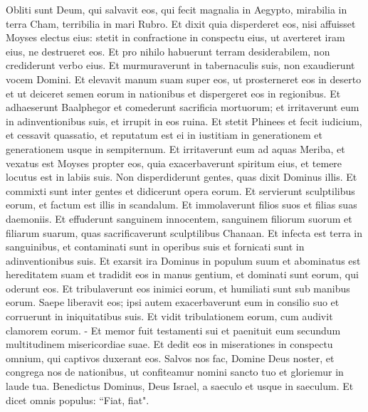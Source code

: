 \begin{biblechapter}
\verse Obliti sunt Deum, qui salvavit eos, qui fecit magnalia in Aegypto, 
\verse mirabilia in terra Cham, terribilia in mari Rubro. 
\verse Et dixit quia disperderet eos, nisi affuisset Moyses electus eius: stetit in confractione in conspectu eius, ut averteret iram eius, ne destrueret eos. 
\verse Et pro nihilo habuerunt terram desiderabilem, non crediderunt verbo eius. 
\verse Et murmuraverunt in tabernaculis suis, non exaudierunt vocem Domini. 
\verse Et elevavit manum suam super eos, ut prosterneret eos in deserto 
\verse et ut deiceret semen eorum in nationibus et dispergeret eos in regionibus. 
\verse Et adhaeserunt Baalphegor et comederunt sacrificia mortuorum; 
\verse et irritaverunt eum in adinventionibus suis, et irrupit in eos ruina. 
\verse Et stetit Phinees et fecit iudicium, et cessavit quassatio, 
\verse et reputatum est ei in iustitiam in generationem et generationem usque in sempiternum. 
\verse Et irritaverunt eum ad aquas Meriba, et vexatus est Moyses propter eos, 
\verse quia exacerbaverunt spiritum eius, et temere locutus est in labiis suis. 
\verse Non disperdiderunt gentes, quas dixit Dominus illis. 
\verse Et commixti sunt inter gentes et didicerunt opera eorum. 
\verse Et servierunt sculptilibus eorum, et factum est illis in scandalum. 
\verse Et immolaverunt filios suos et filias suas daemoniis. 
\verse Et effuderunt sanguinem innocentem, sanguinem filiorum suorum et filiarum suarum, quas sacrificaverunt sculptilibus Chanaan. Et infecta est terra in sanguinibus, 
\verse et contaminati sunt in operibus suis et fornicati sunt in adinventionibus suis. 
\verse Et exarsit ira Dominus in populum suum et abominatus est hereditatem suam 
\verse et tradidit eos in manus gentium, et dominati sunt eorum, qui oderunt eos. 
\verse Et tribulaverunt eos inimici eorum, et humiliati sunt sub manibus eorum. 
\verse Saepe liberavit eos; ipsi autem exacerbaverunt eum in consilio suo et corruerunt in iniquitatibus suis. 
\verse Et vidit tribulationem eorum, cum audivit clamorem eorum. - 
\verse Et memor fuit testamenti sui et paenituit eum secundum multitudinem misericordiae suae. 
\verse Et dedit eos in miserationes in conspectu omnium, qui captivos duxerant eos. 
\verse Salvos nos fac, Domine Deus noster, et congrega nos de nationibus, ut confiteamur nomini sancto tuo et gloriemur in laude tua. 
\verse Benedictus Dominus, Deus Israel, a saeculo et usque in saeculum. Et dicet omnis populus: “Fiat, fiat". 
\end{biblechapter}

\begin{biblechapter}   
\end{biblechapter}

